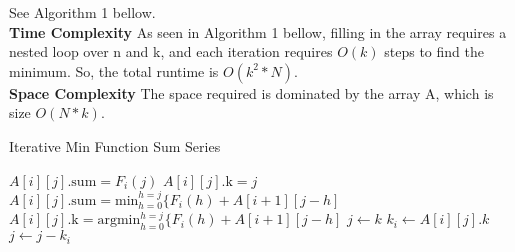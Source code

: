 \documentclass[11pt]{article}
\begin{document}
\begin{solution}
See Algorithm 1 bellow. \\

\textbf{Time Complexity}
As seen in Algorithm 1 bellow, filling in the array requires a nested loop over n and k, and each iteration requires $O(k)$ steps to find the minimum. So, the total runtime is $O(k^2*N)$. \\
\textbf{Space Complexity}
The space required is dominated by the array A, which is size $O(N*k)$.
\begin{algorithm}
\caption{Iterative Min Function Sum Series}
\begin{algorithmic}
\STATE $A[i][j].\text{sum} = F_i(j)$
\STATE $A[i][j].\text{k} = j$
\ELSE
\STATE $A[i][j].\text{sum} = \text{min}_{h=0}^{h=j} \{ F_i(h) + A[i+1][j-h]$
\STATE $A[i][j].\text{k} = \text{argmin}_{h=0}^{h=j} \{ F_i(h) + A[i+1][j-h]$
\ENDIF
\ENDFOR
\ENDFOR
\STATE $j \gets k$
\STATE $k_i \gets A[i][j].k$
\STATE $j \gets j - k_i$
\ENDFOR
\end{algorithmic}
\end{algorithm} 
\end{solution}
\end{document}
